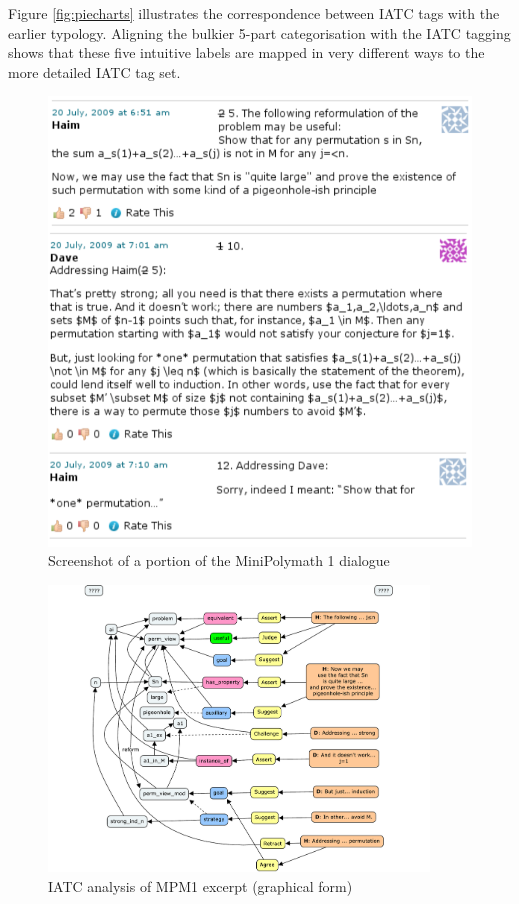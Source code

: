 \documentclass[smallextended,oneside]{svjour3}       %
\begin{document}
Figure \ref{fig:piecharts} illustrates the correspondence between IATC
tags with the earlier typology.  Aligning the bulkier 5-part
categorisation with the IATC tagging shows that these five intuitive
labels are mapped in very different ways to the more detailed IATC tag
set.

\begin{figure}
\begin{center}
\includegraphics[width=.62\textwidth]{sample-minipolymath-comments}
\end{center}
\caption{Screenshot of a portion of the MiniPolymath 1 dialogue\label{fig:running-example-introduced}}
\end{figure}

\begin{figure}[h]\label{IATCtagging}
\begin{center}
\includegraphics[trim=2mm 0 1mm 18mm,clip=true,width=0.9\textwidth]{IATCmainexample}
\end{center}
\caption{IATC analysis of MPM1 excerpt (graphical form)\label{fig:running-example-analysed-graphic}}
\end{figure}
\end{document}
